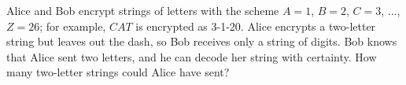 Alice and Bob encrypt strings of letters with the scheme $A=1$, $B=2$, $C=3$, $\dots$, $Z=26$; for example, $CAT$ is encrypted as 3-1-20. Alice encrypts a two-letter string but leaves out the dash, so Bob receives only a string of digits. Bob knows that Alice sent two letters, and he can decode her string with certainty. How many two-letter strings could Alice have sent?
